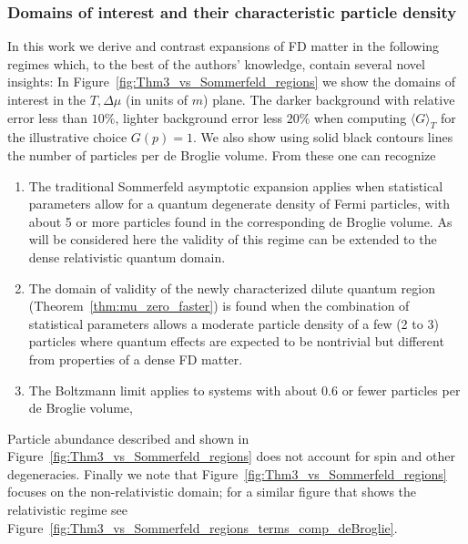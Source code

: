 \documentclass[sn-mathphys,Numbered]{sn-jnl}
\newcommand{\rf}[1]{Figure~{\ref{#1}}}
\newcommand*{\xgreen}{\color{green}}
\newcommand{\rTh}[1]{Theorem~{\ref{#1}}}
\begin{document}
\subsubsection{Domains of interest and their characteristic  particle density}\label{domains}
In this work we derive and contrast expansions of FD matter in the following regimes which, to the best of the authors' knowledge, contain several novel insights: In \rf{fig:Thm3_vs_Sommerfeld_regions} we show the domains of interest in the $T,\Delta\mu$ (in units of $m$) plane. The  darker background with relative error less than $10\%$, lighter background error less $20\%$ when computing $\langle G\rangle_T$ for the illustrative choice $G(p)=1$.  We also show using solid black contours lines the number of particles per de Broglie volume. From these one can recognize
\begin{enumerate}
\item
The traditional Sommerfeld asymptotic expansion applies when statistical parameters allow for a quantum degenerate density of Fermi particles, with about 5 or more particles found in the corresponding de Broglie volume. As will be considered here the validity of this regime can be extended to the dense relativistic quantum domain. 
\item 
The domain of validity of the newly characterized dilute quantum region (\rTh{thm:mu_zero_faster}) is found when the combination of statistical parameters allows a moderate particle density of a few (2 to 3) particles where quantum effects are expected to be nontrivial but different from properties of a dense FD matter. 
\item
The Boltzmann limit applies to systems with about 0.6  or fewer particles per de Broglie volume, 
\end{enumerate}
Particle abundance described and shown in \rf{fig:Thm3_vs_Sommerfeld_regions} does not account for spin and other degeneracies.  Finally we note that \rf{fig:Thm3_vs_Sommerfeld_regions}  focuses on the non-relativistic domain; for a similar figure that shows the relativistic regime see \rf{fig:Thm3_vs_Sommerfeld_regions_terms_comp_deBroglie}.
\end{document}
